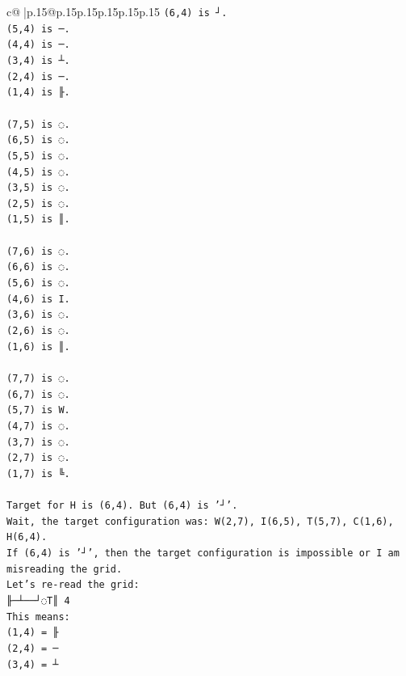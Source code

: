 \documentclass{article}
\begin{document}
{\begin{supertabular}{c@{$\;$}|p{.15\linewidth}@{}p{.15\linewidth}p{.15\linewidth}p{.15\linewidth}p{.15\linewidth}p{.15\linewidth}}
{{{\texttt{(6,4) is ┘.} \\
\texttt{(5,4) is ─.} \\
\texttt{(4,4) is ─.} \\
\texttt{(3,4) is ┴.} \\
\texttt{(2,4) is ─.} \\
\texttt{(1,4) is ╟.} \\
\\ 
\texttt{(7,5) is ◌.} \\
\texttt{(6,5) is ◌.} \\
\texttt{(5,5) is ◌.} \\
\texttt{(4,5) is ◌.} \\
\texttt{(3,5) is ◌.} \\
\texttt{(2,5) is ◌.} \\
\texttt{(1,5) is ║.} \\
\\ 
\texttt{(7,6) is ◌.} \\
\texttt{(6,6) is ◌.} \\
\texttt{(5,6) is ◌.} \\
\texttt{(4,6) is I.} \\
\texttt{(3,6) is ◌.} \\
\texttt{(2,6) is ◌.} \\
\texttt{(1,6) is ║.} \\
\\ 
\texttt{(7,7) is ◌.} \\
\texttt{(6,7) is ◌.} \\
\texttt{(5,7) is W.} \\
\texttt{(4,7) is ◌.} \\
\texttt{(3,7) is ◌.} \\
\texttt{(2,7) is ◌.} \\
\texttt{(1,7) is ╚.} \\
\\ 
\texttt{Target for H is (6,4). But (6,4) is '┘'.} \\
\texttt{Wait, the target configuration was: W(2,7), I(6,5), T(5,7), C(1,6), H(6,4).} \\
\texttt{If (6,4) is '┘', then the target configuration is impossible or I am misreading the grid.} \\
\texttt{Let's re{-}read the grid:} \\
\texttt{╟─┴──┘◌T║ 4} \\
\texttt{This means:} \\
\texttt{(1,4) = ╟} \\
\texttt{(2,4) = ─} \\
\texttt{(3,4) = ┴} \\
}}}
\end{supertabular}}
\end{document}
